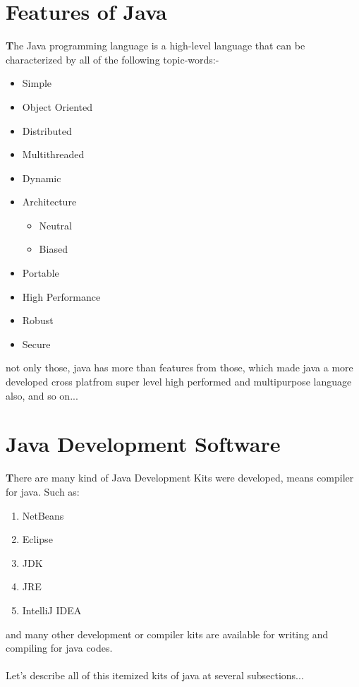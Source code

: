 \documentclass[paper = A5, headinclude, parskip = full, oneside, font = 11 pt]{report}
\begin{document}
\newpage

\color{green}
\section{Features of Java}

\color{black}
\textbf{T}he Java programming language is a high-level language that can be characterized by all of the following topic-words:-

\begin{itemize}
 \item Simple
 \item Object Oriented
 \item Distributed
 \item Multithreaded
 \item Dynamic
 \item Architecture
  \begin{itemize}
   \item Neutral
   \item Biased
  \end{itemize}
 \item Portable
 \item High Performance
 \item Robust
 \item Secure
\end{itemize}

not only those, java has more than features from those, which made java a more developed cross platfrom super level high performed and multipurpose language also, and so on...

\color{green}
\section{Java Development Software}

\color{black}
\textbf{T}here are many kind of Java Development Kits were developed, means compiler for java. Such as:

\begin{enumerate}
 \item NetBeans
 \item Eclipse
 \item JDK
 \item JRE
 \item IntelliJ IDEA
\end{enumerate}

and many other development or compiler kits are available for writing and compiling for java codes.
\\
\\
Let's describe all of this itemized kits of java at several subsections...
\end{document}
